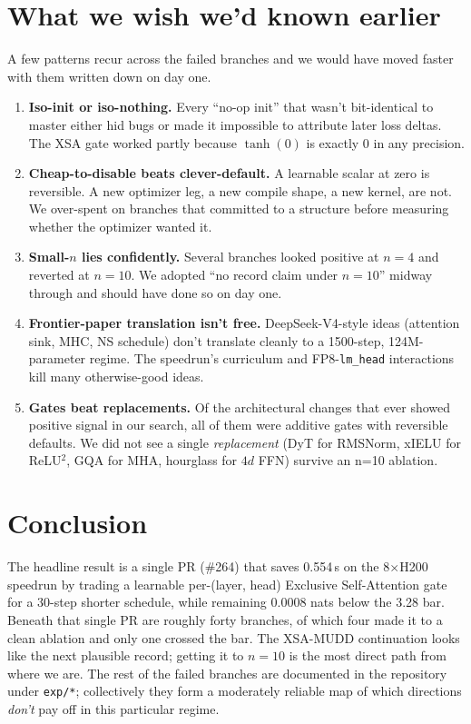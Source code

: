 \documentclass[10pt,letterpaper]{article}
\newcommand{\code}[1]{\texttt{\small #1}}
\begin{document}
\section{What we wish we'd known earlier}
\label{sec:lessons}

A few patterns recur across the failed branches and we would have moved faster with them written down on day one.
\begin{enumerate}[leftmargin=1.4em,itemsep=0pt]
  \item \textbf{Iso-init or iso-nothing.} Every ``no-op init'' that wasn't bit-identical to master either hid bugs or made it impossible to attribute later loss deltas. The XSA gate worked partly because $\tanh(0)$ is exactly $0$ in any precision.
  \item \textbf{Cheap-to-disable beats clever-default.} A learnable scalar at zero is reversible. A new optimizer leg, a new compile shape, a new kernel, are not. We over-spent on branches that committed to a structure before measuring whether the optimizer wanted it.
  \item \textbf{Small-$n$ lies confidently.} Several branches looked positive at $n=4$ and reverted at $n=10$. We adopted ``no record claim under $n=10$'' midway through and should have done so on day one.
  \item \textbf{Frontier-paper translation isn't free.} DeepSeek-V4-style ideas (attention sink, MHC, NS schedule) don't translate cleanly to a 1500-step, 124M-parameter regime. The speedrun's curriculum and FP8-\code{lm\_head} interactions kill many otherwise-good ideas.
  \item \textbf{Gates beat replacements.} Of the architectural changes that ever showed positive signal in our search, all of them were additive gates with reversible defaults. We did not see a single \emph{replacement} (DyT for RMSNorm, xIELU for ReLU\(^2\), GQA for MHA, hourglass for $4d$ FFN) survive an n=10 ablation.
\end{enumerate}

\section{Conclusion}

The headline result is a single PR (\#264) that saves 0.554\,s on the 8\(\times\)H200 speedrun by trading a learnable per-(layer, head) Exclusive Self-Attention gate for a 30-step shorter schedule, while remaining 0.0008 nats below the 3.28 bar. Beneath that single PR are roughly forty branches, of which four made it to a clean ablation and only one crossed the bar. The XSA-MUDD continuation looks like the next plausible record; getting it to $n=10$ is the most direct path from where we are. The rest of the failed branches are documented in the repository under \code{exp/*}; collectively they form a moderately reliable map of which directions \emph{don't} pay off in this particular regime.
\end{document}
